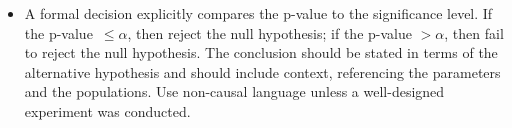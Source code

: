 \begin{itemize}
\item A formal decision explicitly compares the p-value to the significance level.  If the \mbox{p-value $\le \alpha$,} then reject the null hypothesis; if the p-value $> \alpha$, then fail to reject the null hypothesis.  The conclusion should be stated in terms of the alternative hypothesis and should include context, referencing the parameters and the populations.  Use non-causal language unless a well-designed experiment was conducted.


\end{itemize}


{}

\reviewchapterheader{}

